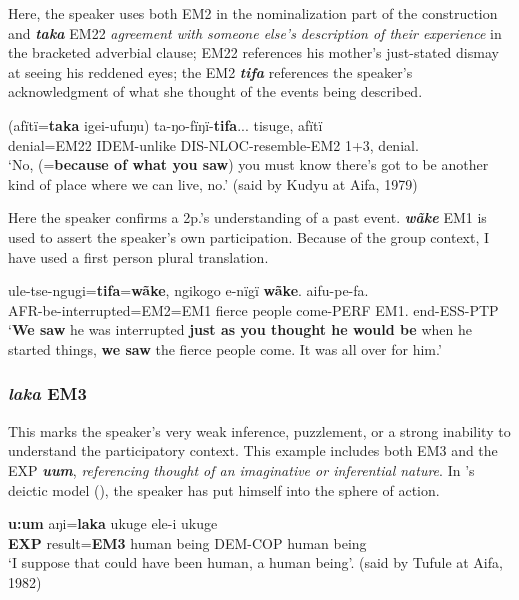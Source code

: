 \documentclass[output=paper]{langsci/langscibook}
\begin{document}
Here, the speaker uses both EM2 in the nominalization part of the construction and  \textbf{\textit{taka}} EM22 \emph{agreement with someone else’s description of their experience} in the bracketed adverbial clause;  EM22 references his mother’s just-stated dismay at seeing his reddened eyes; the EM2 \textbf{\textit{tifa}} references the speaker’s acknowledgment of what she thought of the events being described. 

\begin{exe}
	\ex \label{ex:eb3}
	\gll (afïtï=\textbf{taka} igei-ufuŋu) ta-ŋo-fïŋï-\textbf{tifa}... tisuge, afïtï\\
	denial=EM22 IDEM-unlike DIS-NLOC-resemble-EM2 1+3, denial.\\
	\trans ‘No, (=\textbf{because of what you saw}) you must know there’s got to be another kind of place where we can live, no.' (said by Kudyu at Aifa, 1979)
\end{exe}

Here the speaker confirms a 2p.’s understanding of a past event.  \textbf{\textit{wãke}} EM1 is used to assert the speaker’s own participation. Because of the group context,  I have used a first person plural translation. 

\begin{exe}
	\ex \label{ex:eb4}
	\gll ule-tse-ngugi=\textbf{tifa}=\textbf{wãke}, ngikogo e-nïgï \textbf{wãke}. aifu-pe-fa.\\
	AFR-be-interrupted=EM2=EM1 {fierce people} come-PERF EM1. end-ESS-PTP\\
	\trans ‘\textbf{We saw} he was interrupted \textbf{just as you thought he would be} when he started things, \textbf{we saw} the fierce people come. It was all over for him.’
\end{exe}

\subsubsection{\textit{laka} EM3} 
This marks the speaker’s  very weak inference, puzzlement, or a strong inability to understand the participatory context. 
This example includes both EM3 and the EXP \textbf{\textit{uum}}, \emph{referencing thought of an imaginative or inferential nature}. In \citeauthor{Haan2001}’s deictic model (\citeyear{Haan2001}), the speaker has put himself into the sphere of action.

\begin{exe}
	\ex \label{ex:eb5}
	\gll \textbf{u:um} aŋi=\textbf{laka} ukuge ele-i ukuge\\
	\textbf{EXP} result=\textbf{EM3} {human being} DEM-COP {human being}\\
	\trans ‘I suppose that could have been human, a human being’. (said by Tufule at Aifa, 1982)
\end{exe}
\end{document}
